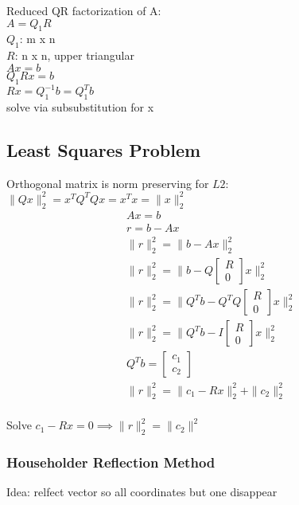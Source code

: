 \documentclass[8pt,letter]{article}
\begin{document}
\begin{multicols*}{2}
    Reduced QR factorization of A:\\
    $A = Q_1 R$\\
    $Q_1$: m x n\\
    $R$: n x n, upper triangular\\

    $Ax = b$\\
    $Q_1 R x = b$\\
    $Rx = Q_1^{-1} b = Q_1^T b$\\
    solve via subsubstitution for x\\

    \subsection{Least Squares Problem}
    Orthogonal matrix is norm preserving for $L2$:\\
    $\|Qx\|_2^2 = x^T Q^T Q x = x^T x = \|x\|_2^2$
    \begin{align*}
      & Ax=b\\
      & r = b-Ax\\
      & \|r\|_2^2 = \|b-Ax\|_2^2\\
      & \|r\|_2^2 = \|b-Q \begin{bmatrix} R \\ 0\end{bmatrix}x\|_2^2\\
      & \|r\|_2^2 = \|Q^Tb - Q^T Q \begin{bmatrix} R \\ 0\end{bmatrix}x\|_2^2\\
      & \|r\|_2^2 = \|Q^Tb - I\begin{bmatrix} R \\ 0\end{bmatrix}x\|_2^2\\
      & Q^T b = \begin{bmatrix} c_1 \\ c_2 \end{bmatrix}\\
      & \|r\|_2^2 = \|c_1 - Rx\|_2^2 + \|c_2\|_2^2\\
    \end{align*}

    Solve $c_1 - Rx=0 \implies \|r\|_2^2 = \|c_2\|^2$
    
    \subsubsection{Householder Reflection Method}
    Idea: relfect vector so all coordinates but one disappear\\


\end{multicols*}
\end{document}
